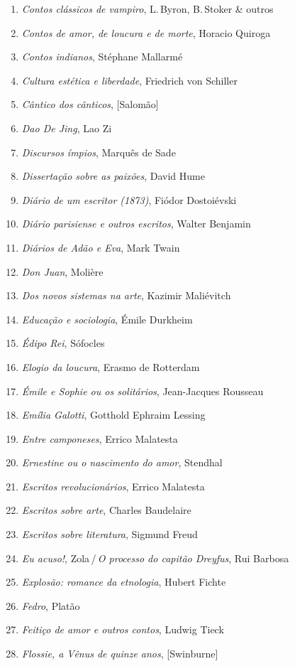 \begin{enumerate}
\item \textit{Contos clássicos de vampiro}, L.\,Byron, B.\,Stoker \& outros
\item \textit{Contos de amor, de loucura e de morte}, Horacio Quiroga
\item \textit{Contos indianos}, Stéphane Mallarmé
\item \textit{Cultura estética e liberdade}, Friedrich von Schiller
\item \textit{Cântico dos cânticos}, [Salomão]
\item \textit{Dao De Jing}, Lao Zi
\item \textit{Discursos ímpios}, Marquês de Sade
\item \textit{Dissertação sobre as paixões}, David Hume
\item \textit{Diário de um escritor (1873)}, Fiódor Dostoiévski
\item \textit{Diário parisiense e outros escritos}, Walter Benjamin
\item \textit{Diários de Adão e Eva}, Mark Twain
\item \textit{Don Juan}, Molière
\item \textit{Dos novos sistemas na arte}, Kazimir Maliévitch
\item \textit{Educação e sociologia}, Émile Durkheim
\item \textit{Édipo Rei}, Sófocles
\item \textit{Elogio da loucura}, Erasmo de Rotterdam
\item \textit{Émile e Sophie ou os solitários}, Jean-Jacques Rousseau 
\item \textit{Emília Galotti}, Gotthold Ephraim Lessing
\item \textit{Entre camponeses}, Errico Malatesta
\item \textit{Ernestine ou o nascimento do amor}, Stendhal
\item \textit{Escritos revolucionários}, Errico Malatesta
\item \textit{Escritos sobre arte}, Charles Baudelaire
\item \textit{Escritos sobre literatura}, Sigmund Freud
\item \textit{Eu acuso!}, Zola\,/\,\textit{O processo do capitão Dreyfus}, Rui Barbosa
\item \textit{Explosão: romance da etnologia}, Hubert Fichte
\item \textit{Fedro}, Platão
\item \textit{Feitiço de amor e outros contos}, Ludwig Tieck
\item \textit{Flossie, a Vênus de quinze anos}, [Swinburne]

\end{enumerate}
